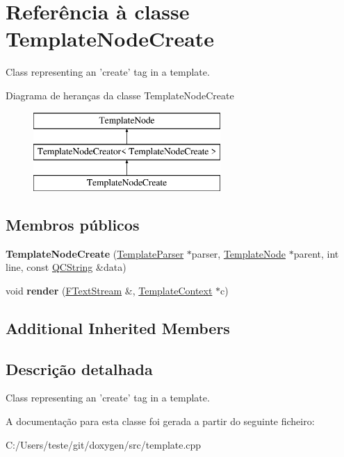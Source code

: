 \hypertarget{class_template_node_create}{\section{Referência à classe Template\-Node\-Create}
\label{class_template_node_create}
}


Class representing an 'create' tag in a template.  


Diagrama de heranças da classe Template\-Node\-Create\begin{figure}[H]
\begin{center}
\leavevmode
\includegraphics[height=3.000000cm]{class_template_node_create}
\end{center}
\end{figure}
\subsection*{Membros públicos}
\begin{DoxyCompactItemize}
\item 
\hypertarget{class_template_node_create_a3db08fe6b685f1e5e6287c57ed4ac246}{{\bfseries Template\-Node\-Create} (\hyperlink{class_template_parser}{Template\-Parser} $\ast$parser, \hyperlink{class_template_node}{Template\-Node} $\ast$parent, int line, const \hyperlink{class_q_c_string}{Q\-C\-String} \&data)}\label{class_template_node_create_a3db08fe6b685f1e5e6287c57ed4ac246}

\item 
\hypertarget{class_template_node_create_a5146579a192ca5057a0be89f9da0220a}{void {\bfseries render} (\hyperlink{class_f_text_stream}{F\-Text\-Stream} \&, \hyperlink{class_template_context}{Template\-Context} $\ast$c)}\label{class_template_node_create_a5146579a192ca5057a0be89f9da0220a}

\end{DoxyCompactItemize}
\subsection*{Additional Inherited Members}


\subsection{Descrição detalhada}
Class representing an 'create' tag in a template. 

A documentação para esta classe foi gerada a partir do seguinte ficheiro\-:\begin{DoxyCompactItemize}
\item 
C\-:/\-Users/teste/git/doxygen/src/template.\-cpp\end{DoxyCompactItemize}
